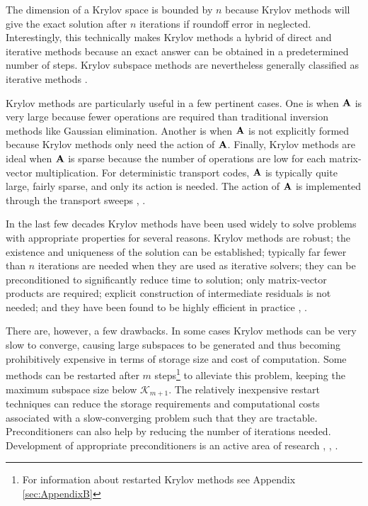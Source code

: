 The dimension of a Krylov space is bounded by $n$ because Krylov methods will give the exact solution after $n$ iterations if roundoff error in neglected. Interestingly, this technically makes Krylov methods a hybrid of direct and iterative methods because an exact answer can be obtained in a predetermined number of steps. Krylov subspace methods are nevertheless generally classified as iterative methods \cite{Birkhoff1984}.

Krylov methods are particularly useful in a few pertinent cases. One is when $\mathbf{A}$ is very large because fewer operations are required than traditional inversion methods like Gaussian elimination. Another is when $\mathbf{A}$ is not explicitly formed because Krylov methods only need the action of $\mathbf{A}$. Finally, Krylov methods are ideal when $\mathbf{A}$ is sparse because the number of operations are low for each matrix-vector multiplication. For deterministic transport codes, $\mathbf{A}$ is typically quite large, fairly sparse, and only its action is needed. The action of $\mathbf{A}$ is implemented through the transport sweeps \cite{Lewis1993}, \cite{Ipsen1998}.  

In the last few decades Krylov methods have been used widely to solve problems with appropriate properties for several reasons. Krylov methods are robust; the existence and uniqueness of the solution can be established; typically far fewer than $n$ iterations are needed when they are used as iterative solvers; they can be preconditioned to significantly reduce time to solution; only matrix-vector products are required; explicit construction of intermediate residuals is not needed; and they have been found to be highly efficient in practice \cite{Ipsen1998}, \cite{Knoll2004}. 

There are, however, a few drawbacks. In some cases Krylov methods can be very slow to converge, causing large subspaces to be generated and thus becoming prohibitively expensive in terms of storage size and cost of computation. Some methods can be restarted after $m$ steps\footnote{For information about restarted Krylov methods see Appendix \ref{sec:AppendixB}} to alleviate this problem, keeping the maximum subspace size below $\mathcal{K}_{m+1}$.  The relatively inexpensive restart techniques can reduce the storage requirements and computational costs associated with a slow-converging problem such that they are tractable. Preconditioners can also help by reducing the number of iterations needed. Development of appropriate preconditioners is an active area of research \cite{Warsa2004a}, \cite{Ipsen1998}, \cite{Knoll2004}. 

